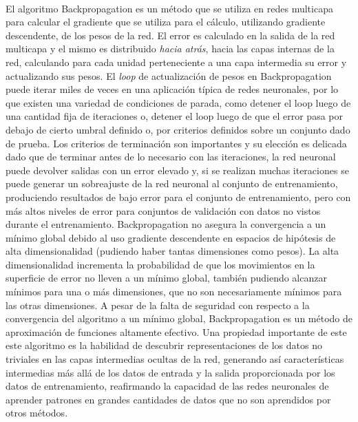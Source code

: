 \paragraph{}El algoritmo Backpropagation es un método que se utiliza en redes multicapa para calcular el gradiente que se utiliza para el cálculo, utilizando gradiente descendente, de los pesos de la red. El error es calculado en la salida de la red multicapa y el mismo es distribuido \textit{hacia atrás}, hacia las capas internas de la red, calculando para cada unidad perteneciente a una capa intermedia su error y actualizando sus pesos. El \textit{loop} de actualización de pesos en Backpropagation puede iterar miles de veces en una aplicación típica de redes neuronales, por lo que existen una variedad de condiciones de parada, como detener el loop luego de una cantidad fija de iteraciones o, detener el loop luego de que el error pasa por debajo de cierto umbral definido o, por criterios definidos sobre un conjunto dado de prueba. Los criterios de terminación son importantes y su elección es delicada dado que de terminar antes de lo necesario con las iteraciones, la red neuronal puede devolver salidas con un error elevado y, si se realizan muchas iteraciones se puede generar un sobreajuste de la red neuronal al conjunto de entrenamiento, produciendo resultados de bajo error para el conjunto de entrenamiento, pero con más altos niveles de error para conjuntos de validación con datos no vistos durante el entrenamiento. Backpropagation no asegura la convergencia a un mínimo global debido al uso gradiente descendente en espacios de hipótesis de alta dimensionalidad (pudiendo haber tantas dimensiones como pesos). La alta dimensionalidad incrementa la probabilidad de que los movimientos en la superficie de error no lleven a un mínimo global, también pudiendo alcanzar mínimos para una o más dimensiones, que no son necesariamente mínimos para las otras dimensiones. A pesar de la falta de seguridad con respecto a la convergencia del algoritmo a un mínimo global, Backpropagation es un método de aproximación de funciones altamente efectivo. Una propiedad importante de este este algoritmo es la habilidad de descubrir representaciones de los datos no triviales en las capas intermedias ocultas de la red, generando así características intermedias más allá de los datos de entrada y la salida proporcionada por los datos de entrenamiento, reafirmando la capacidad de las redes neuronales de aprender patrones en grandes cantidades de datos que no son aprendidos por otros métodos. 

